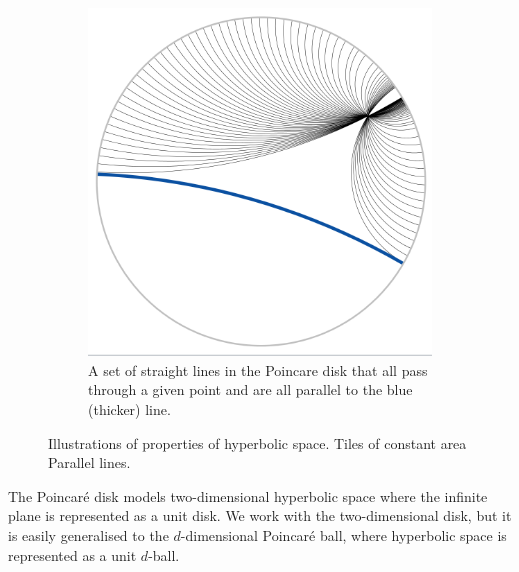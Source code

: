 \documentclass[sigconf, review]{acmart}
\begin{document}
\begin{figure}[tb]
\begin{subfigure}[t]{0.4\hsize}
        \includegraphics[width=\hsize]{parallel_lines.png}
        \caption{A set of straight lines in the Poincare disk that all pass through a given point and are all parallel to the blue (thicker) line.}
        \label{fig:parallel}
    \end{subfigure}%
    \caption{Illustrations of properties of hyperbolic space.   Tiles of constant area  Parallel lines.}
    \label{fig:hyperbolic illustration}
    \end{figure}

The Poincar\'e disk models two-dimensional hyperbolic space where the infinite plane is represented as a unit disk.
We work with the two-dimensional disk, but it is easily generalised to the $d$-dimensional Poincar\'e ball, where hyperbolic space is represented as a unit $d$-ball. 
\end{document}
